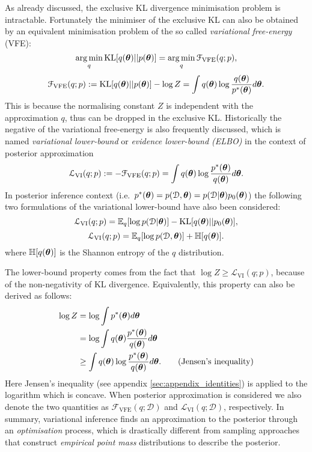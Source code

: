 As already discussed, the exclusive KL divergence minimisation problem is intractable. Fortunately the minimiser of the exclusive KL can also be obtained by an equivalent minimisation problem of the so called \emph{variational free-energy} (VFE):
$$ \operatorname*{arg\,min}_{q} \mathrm{KL}[q(\bm{\theta})||p(\bm{\theta})] = \operatorname*{arg\,min}_{q} \mathcal{F}_{\text{VFE}}(q; p),$$
\begin{equation}
\mathcal{F}_{\text{VFE}}(q; p) := \mathrm{KL}[q(\bm{\theta})||p(\bm{\theta})] - \log Z = \int q(\bm{\theta}) \log \frac{q(\bm{\theta})}{p^*(\bm{\theta})} d\bm{\theta}.
\label{eq:chap2_vfe}
\end{equation}
%
This is because the normalising constant $Z$ is independent with the approximation $q$, thus can be dropped in the exclusive KL. Historically the negative of the variational free-energy is also frequently discussed, which is named \emph{variational lower-bound} or \emph{evidence lower-bound (ELBO)} in the context of posterior approximation
\begin{equation}
\mathcal{L}_{\text{VI}}(q; p) := - \mathcal{F}_{\text{VFE}}(q; p) = \int q(\bm{\theta}) \log \frac{p^*(\bm{\theta})}{q(\bm{\theta})} d\bm{\theta}.
\label{eq:chap2_vi_lowerbound}
\end{equation}
In posterior inference context (i.e.~$p^*(\bm{\theta}) = p(\mathcal{D}, \bm{\theta}) = p(\mathcal{D} | \bm{\theta}) p_0(\bm{\theta})$) the following two formulations of the variational lower-bound have also been considered:
\begin{equation}
\mathcal{L}_{\text{VI}}(q; p) = \mathbb{E}_q[\log p(\mathcal{D} | \bm{\theta})] - \mathrm{KL}[q(\bm{\theta}) || p_0(\bm{\theta}) ],
\end{equation}
%
\begin{equation}
\mathcal{L}_{\text{VI}}(q; p) = \mathbb{E}_q[\log p(\mathcal{D}, \bm{\theta})] + \mathbb{H}[q(\bm{\theta})].
\end{equation}
where $\mathbb{H}[q(\bm{\theta})]$ is the Shannon entropy of the $q$ distribution.

The lower-bound property comes from the fact that $\log Z \geq \mathcal{L}_{\text{VI}}(q; p)$, because of the non-negativity of KL divergence. Equivalently, this property can also be derived as follows: 
%
\begin{equation*}
\begin{aligned}
\log Z &= \log \int p^*(\bm{\theta}) d \bm{\theta} \\
&= \log \int q(\bm{\theta}) \frac{p^*(\bm{\theta})}{q(\bm{\theta})} d \bm{\theta} \\
&\geq \int q(\bm{\theta}) \log \frac{p^*(\bm{\theta})}{q(\bm{\theta})} d \bm{\theta}. \quad\quad \text{(Jensen's inequality)}
\end{aligned}
\end{equation*}
Here Jensen's inequality (see appendix \ref{sec:appendix_identities}) is applied to the logarithm which is concave.
%
When posterior approximation is considered we also denote the two quantities as $\mathcal{F}_{\text{VFE}}(q; \mathcal{D})$ and $\mathcal{L}_{\text{VI}}(q; \mathcal{D})$, respectively. 
%
In summary, variational inference finds an approximation to the posterior through an \emph{optimisation} process, which is drastically different from sampling approaches that construct \emph{empirical point mass} distributions to describe the posterior.

